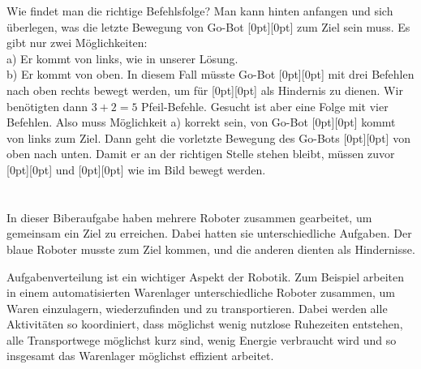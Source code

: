 {{Wie findet man die richtige Befehlsfolge?  Man kann hinten anfangen und sich überlegen, was die letzte Bewegung von Go-Bot \raisebox{-0.5ex}[0pt][0pt]{} zum Ziel sein muss. Es gibt nur zwei Möglichkeiten: \\
a) Er kommt von links, wie in unserer Lösung. \\
b) Er kommt von oben. In diesem Fall müsste Go-Bot \raisebox{-0.5ex}[0pt][0pt]{} mit drei Befehlen nach oben rechts bewegt werden, um für \raisebox{-0.5ex}[0pt][0pt]{} als Hindernis zu dienen. Wir benötigten dann ${3 + 2 = 5}$ Pfeil-Befehle.
Gesucht ist aber eine Folge mit vier Befehlen. Also muss Möglichkeit a) korrekt sein, von Go-Bot \raisebox{-0.5ex}[0pt][0pt]{} kommt von links zum Ziel. Dann geht die vorletzte Bewegung des Go-Bots \raisebox{-0.5ex}[0pt][0pt]{} von oben nach unten. Damit er an der richtigen Stelle stehen bleibt, müssen zuvor \raisebox{-0.5ex}[0pt][0pt]{} und \raisebox{-0.5ex}[0pt][0pt]{} wie im Bild bewegt werden.



\section*{\BrochureItsInformatics}
In dieser Biberaufgabe haben mehrere Roboter zusammen gearbeitet, um gemeinsam ein Ziel zu erreichen. Dabei hatten sie unterschiedliche Aufgaben. Der blaue Roboter musste zum Ziel kommen, und die anderen dienten als Hindernisse.

Aufgabenverteilung ist ein wichtiger Aspekt der Robotik. Zum Beispiel arbeiten in einem automatisierten Warenlager unterschiedliche Roboter zusammen, um Waren einzulagern, wiederzufinden und zu transportieren. Dabei werden alle Aktivitäten so koordiniert, dass möglichst wenig nutzlose Ruhezeiten entstehen, alle Transportwege möglichst kurz sind, wenig Energie verbraucht wird und so insgesamt das Warenlager möglichst effizient arbeitet.

}}
